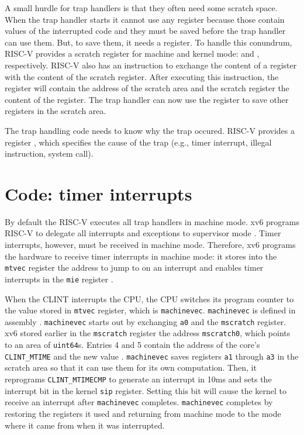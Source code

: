 A small hurdle for trap handlers is that they often
need some scratch space. When the trap handler starts it cannot
use any register because those contain values of the interrupted code
and they must be saved before the trap handler can use them. But,
to save them, it needs a register.  To handle this conundrum,
RISC-V provides a scratch register for machine and kernel
mode:  and , respectively.
RISC-V also has an instruction to exchange the content
of a register with the content of the scratch register. After
executing this instruction, the register will contain the address of
the scratch area and the scratch register the content of the
register. The trap handler can now use the register to save other
registers in the scratch area.

The trap handling code needs to know why the trap occured.
RISC-V provides a register
, which specifies the cause of the trap (e.g.,
timer interrupt, illegal instruction, system call).

\section{Code: timer interrupts}

By default the RISC-V executes all trap handlers in machine mode.  xv6 programs
RISC-V to delegate all interrupts and exceptions to supervisor mode
.
Timer interrupts, however, must be received in machine
mode. Therefore, xv6 programs the hardware to receive timer interrupts in
machine mode: it stores into the \lstinline{mtvec} register the
address to jump to on an interrupt 
and enables timer interrupts in the \lstinline{mie} register
.

When the CLINT interrupts the CPU, the CPU switches its
program counter to the value stored in \lstinline{mtvec} register,
which is \lstinline{machinevec}.  \lstinline{machinevec} is defined in
assembly .
\lstinline{machinevec} starts out by exchanging \lstinline{a0} and the
\lstinline{mscratch} register.  xv6 stored earlier in the
\lstinline{mscratch} register  the
address \lstinline{mscratch0}, which points to an area of
\lstinline{uint64}s.  Entries 4 and 5 contain the address of the
core's \lstinline{CLINT_MTIME} and the new value
.
\lstinline{machinevec} saves registers \lstinline{a1} through
\lstinline{a3} in the scratch area so that it can use them for its own
computation.  Then, it reprograms \lstinline{CLINT_MTIMECMP} to
generate an interrupt in 10ms and sets the interrupt bit in the kernel
\lstinline{sip} register.  Setting this bit will cause the kernel to
receive an interrupt after \lstinline{machinevec} completes.
\lstinline{machinevec} completes by restoring the registers it used
and returning from machine mode  to
the mode where it came from when it was interrupted.

